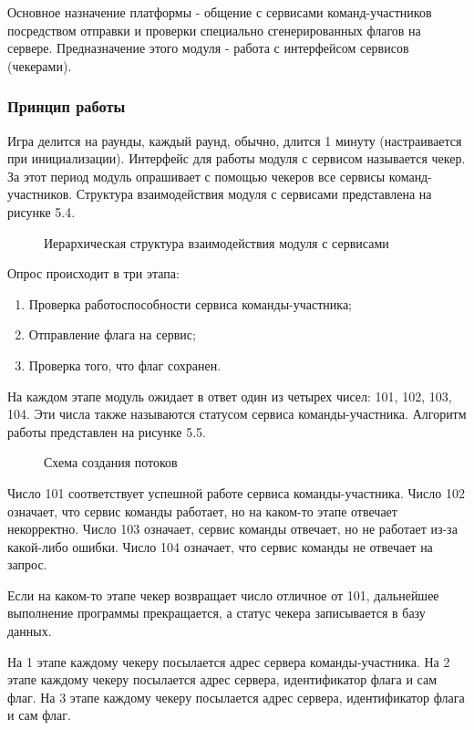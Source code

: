 Основное назначение платформы - общение с сервисами команд-участников посредством отправки и проверки специально сгенерированных флагов на сервере. Предназначение этого модуля - работа с интерфейсом сервисов (чекерами).

\subsubsection{Принцип работы}
Игра делится на раунды, каждый раунд, обычно, длится 1 минуту (настраивается при инициализации). Интерфейс для работы модуля с сервисом называется чекер. За этот период модуль опрашивает с помощью чекеров все сервисы команд-участников. Структура взаимодействия модуля с сервисами представлена на рисунке 5.4.

\begin{figure}[ht!]
\caption{Иерархическая структура взаимодействия модуля с сервисами}
\end{figure}

Опрос происходит в три этапа:
\begin{enumerate} 
\item Проверка работоспособности сервиса команды-участника;
\item Отправление флага на сервис; 
\item Проверка того, что флаг сохранен.
\end{enumerate}

На каждом этапе модуль ожидает в ответ один из четырех чисел: 101, 102, 103, 104. Эти числа также называются статусом сервиса команды-участника. Алгоритм работы представлен на рисунке 5.5.

\begin{figure}[ht!]
\caption{Схема создания потоков}
\end{figure}


Число 101 соответствует успешной работе сервиса команды-участника. Число 102 означает, что сервис команды работает, но на каком-то этапе отвечает некорректно. Число 103 означает, сервис команды отвечает, но не работает из-за какой-либо ошибки. Число 104 означает, что сервис команды не отвечает на запрос. 

Если на каком-то этапе чекер возвращает число отличное от 101, дальнейшее выполнение программы прекращается, а статус чекера записывается в базу данных.

На 1 этапе каждому чекеру посылается адрес сервера команды-участника. 
На 2 этапе каждому чекеру посылается адрес сервера, идентификатор флага и сам флаг. 
На 3 этапе каждому чекеру посылается адрес сервера, идентификатор флага и сам флаг.

